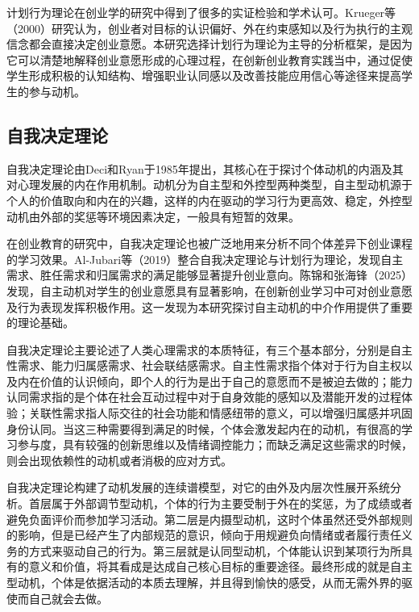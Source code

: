 计划行为理论在创业学的研究中得到了很多的实证检验和学术认可。Krueger等\nolinebreak[3]（2000）研究认为，创业者对目标的认识偏好、外在约束感知以及行为执行的主观信念都会直接决定创业意愿\cite{Krueger2000}。本研究选择计划行为理论为主导的分析框架，是因为它可以清楚地解释创业意愿形成的心理过程，在创新创业教育实践当中，通过促使学生形成积极的认知结构、增强职业认同感以及改善技能应用信心等途径来提高学生的参与动机。

\subsection{自我决定理论}

自我决定理论由Deci和Ryan于1985年提出，其核心在于探讨个体动机的内涵及其对心理发展的内在作用机制。动机分为自主型和外控型两种类型，自主型动机源于个人的价值取向和内在的兴趣，这样的内在驱动的学习行为更高效、稳定，外控型动机由外部的奖惩等环境因素决定，一般具有短暂的效果。

在创业教育的研究中，自我决定理论也被广泛地用来分析不同个体差异下创业课程的学习效果。Al-Jubari等\nolinebreak[3]（2019）整合自我决定理论与计划行为理论，发现自主需求、胜任需求和归属需求的满足能够显著提升创业意向\cite{AlJubari2019}。陈锦和张海锋\nolinebreak[3]（2025）发现，自主动机对学生的创业意愿具有显著影响，在创新创业学习中可对创业意愿及行为表现发挥积极作用\cite{chenjin2025}。这一发现为本研究探讨自主动机的中介作用提供了重要的理论基础。

自我决定理论主要论述了人类心理需求的本质特征，有三个基本部分，分别是自主性需求、能力归属感需求、社会联结感需求。自主性需求指个体对于行为自主权以及内在价值的认识倾向，即个人的行为是出于自己的意愿而不是被迫去做的；能力认同需求指的是个体在社会互动过程中对于自身效能的感知以及潜能开发的过程体验；关联性需求指人际交往的社会功能和情感纽带的意义，可以增强归属感并巩固身份认同。当这三种需要得到满足的时候，个体会激发起内在的动机，有很高的学习参与度，具有较强的创新思维以及情绪调控能力；而缺乏满足这些需求的时候，则会出现依赖性的动机或者消极的应对方式。

自我决定理论构建了动机发展的连续谱模型，对它的由外及内层次性展开系统分析。首层属于外部调节型动机，个体的行为主要受制于外在的奖惩，为了成绩或者避免负面评价而参加学习活动。第二层是内摄型动机，这时个体虽然还受外部规则的影响，但是已经产生了内部规范的意识，倾向于用规避负向情绪或者履行责任义务的方式来驱动自己的行为。第三层就是认同型动机，个体能认识到某项行为所具有的意义和价值，将其看成是达成自己核心目标的重要途径。最终形成的就是自主型动机，个体是依据活动的本质去理解，并且得到愉快的感受，从而无需外界的驱使而自己就会去做。

